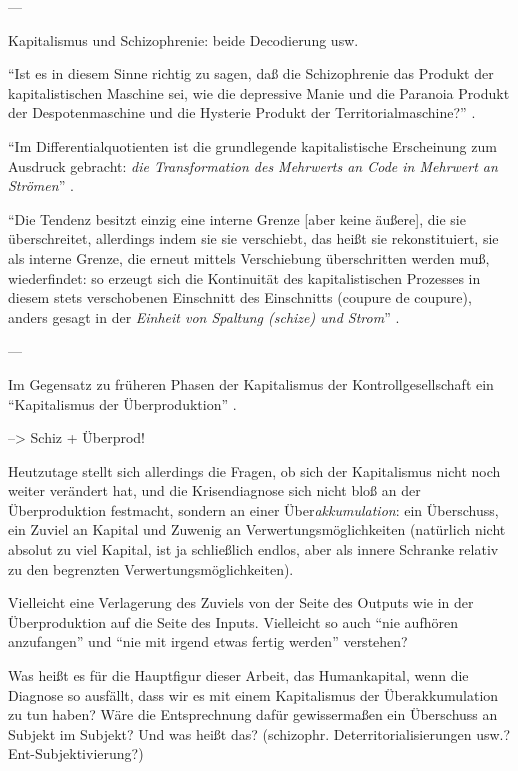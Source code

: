 \documentclass[12pt,
               DIV13,
               paper=a4,
               twoside=false,
               onehalfspacing,
               bibliography=totoc,
               toc=graduated,
               draft,
               ]{scrartcl}
\newcommand{\pc}[2]{\parencite[#1]{#2}}
\newcommand{\worries}[1]{\ifdraft{\textcolor{blue}{\texttt{(#1)}}}{}}
\begin{document}
---

Kapitalismus und Schizophrenie: beide Decodierung usw.

"`Ist es in diesem Sinne richtig zu sagen, daß die Schizophrenie das
Produkt der kapitalistischen Maschine sei, wie die depressive Manie
und die Paranoia Produkt der Despotenmaschine und die Hysterie Produkt
der Territorialmaschine?"' \pc{44}{ao}.

"`Im Differentialquotienten ist die grundlegende kapitalistische
Erscheinung zum Ausdruck gebracht: \emph{die Transformation des
Mehrwerts an Code in Mehrwert an Strömen}"' \pc{S. 292 f.}{ao}.

"`Die Tendenz besitzt einzig eine interne Grenze [aber keine äußere],
die sie überschreitet, allerdings indem sie sie verschiebt, das heißt
sie rekonstituiert, sie als interne Grenze, die erneut mittels
Verschiebung überschritten \worries{Selbst-Überschreitung} werden muß,
wiederfindet: so erzeugt sich die Kontinuität des kapitalistischen
Prozesses in diesem stets verschobenen Einschnitt des Einschnitts
(coupure de coupure), anders gesagt in der \emph{Einheit von Spaltung
(schize) und Strom}"' \pc{S. 296, meine Hervorh.}{ao}.

---

Im Gegensatz zu früheren Phasen der Kapitalismus der
Kontrollgesellschaft ein "`Kapitalismus der Überproduktion"'
\pc{259}{ps}.

--> Schiz + Überprod!

Heutzutage stellt sich allerdings die Fragen, ob sich der Kapitalismus
nicht noch weiter verändert hat, und die Krisendiagnose sich nicht
bloß an der Überproduktion festmacht, sondern an einer
Über\emph{akkumulation}: ein Überschuss, ein Zuviel an Kapital und
Zuwenig an Verwertungsmöglichkeiten (natürlich nicht absolut zu viel
Kapital, ist ja schließlich endlos, aber als innere Schranke relativ
zu den begrenzten Verwertungsmöglichkeiten).

Vielleicht eine Verlagerung des Zuviels von der Seite des Outputs wie
in der Überproduktion auf die Seite des Inputs. Vielleicht so auch
"`nie aufhören anzufangen"' und "`nie mit irgend etwas fertig werden"'
verstehen?

Was heißt es für die Hauptfigur dieser Arbeit, das Humankapital, wenn
die Diagnose so ausfällt, dass wir es mit einem Kapitalismus der
Überakkumulation zu tun haben? Wäre die Entsprechnung dafür
gewissermaßen ein Überschuss an Subjekt im Subjekt? Und was heißt das?
(schizophr. Deterritorialisierungen usw.? Ent-Subjektivierung?)
\end{document}
